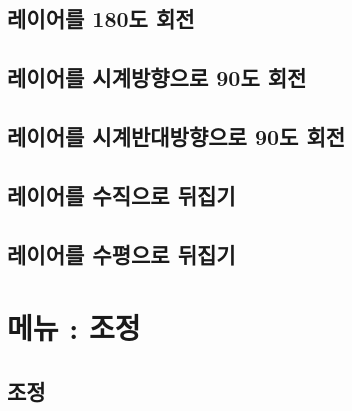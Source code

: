 \documentclass[12pt, a4paper, oneside]{book}
\let\stdsection\section
\renewcommand\section{\newpage\stdsection}
\begin{document}
\section{	레이어를 180도 회전				}							
\section{	레이어를 시계방향으로 90도 회전				}							
\section{	레이어를 시계반대방향으로 90도 회전				}							
\section{	레이어를 수직으로 뒤집기				}							
\section{	레이어를 수평으로 뒤집기				}							




	\chapter{메뉴 : 조정} 
	\minitoc
	\section{	조정	}
																			
\end{document}
